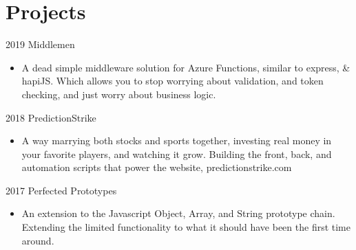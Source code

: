 \documentclass[letterpaper]{twentysecondcv} %
\begin{document}
\section{Projects}
\begin{twenty} %

\twentyitem
    	{2019}
		{}
        {Middlemen}
        {}
        {}
        {\begin{itemize}
        \item A dead simple middleware solution for Azure Functions, similar to express, \& hapiJS. Which allows you to stop worrying about validation, and token checking, and just worry about business logic.
        \vspace{1mm}
        \end{itemize}}
\twentyitem
    	{2018}
		{}
        {PredictionStrike}
        {}
        {}
        {\begin{itemize}
        \item A way marrying both stocks and sports together, investing real money in your favorite players, and watching it grow. Building the front, back, and automation scripts that power the website, predictionstrike.com
        \vspace{1mm}
        \end{itemize}}
\twentyitem
    	{2017}
		{}
        {Perfected Prototypes}
        {}
        {}
        {\begin{itemize}
        \item An extension to the Javascript Object, Array, and String prototype chain. Extending the limited functionality to what it should have been the first time around. 
        \end{itemize}}
\end{twenty}
\end{document}
